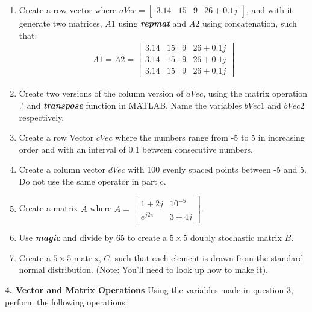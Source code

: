 \documentclass[11pt]{article}
\newenvironment{qparts}{\begin{enumerate}[{(}a{)}]}{\end{enumerate}}
\begin{document}
\begin{qparts}
    \item Create a row vector where 
    $ aVec = \begin{bmatrix}3.14&15&9&26+0.1j\end{bmatrix}$,
    and with it generate two matrices, $A1$ using \textbf{\textit{repmat}}
    and $A2$ using concatenation, such that:
    \begin{align*}
    A1 = A2 = \begin{bmatrix}3.14&15&9& 26+0.1j \\ 3.14&15&9&26+0.1j\\3.14&15&9&26+0.1j\end{bmatrix}
    \end{align*}

    \item Create two versions of the column version of $aVec$,
    using the matrix operation $.'$ and
    \textbf{\textit{transpose}} function in MATLAB.
    Name the variables $bVec1$ and $bVec2$ respectively.

    \item Create a row Vector $cVec$ where the numbers range from -5 to 5
    in increasing order and with an interval of 0.1 between consecutive numbers.

    \item Create a column vector $dVec$ with 100 evenly spaced points between -5 and 5.
    Do not use the same operator in part c.

    \item Create a matrix $A$ where 
    $A = \begin{bmatrix} 1+2j&10^{-5}\\ e^{j2\pi}&3+4j \end{bmatrix}$.

    \item Use \textbf{\textit{magic}} and divide by 65 to create a $5 \times 5$
    doubly stochastic matrix $B$.

    \item Create a $5 \times 5$ matrix, $C$,
    such that each element is drawn from the standard normal distribution.
    (Note: You'll need to look up how to make it).

\end{qparts}

\noindent 
\newline
\textbf{4. Vector and Matrix Operations}
Using the variables made in question 3,
perform the following operations:
\end{document}
